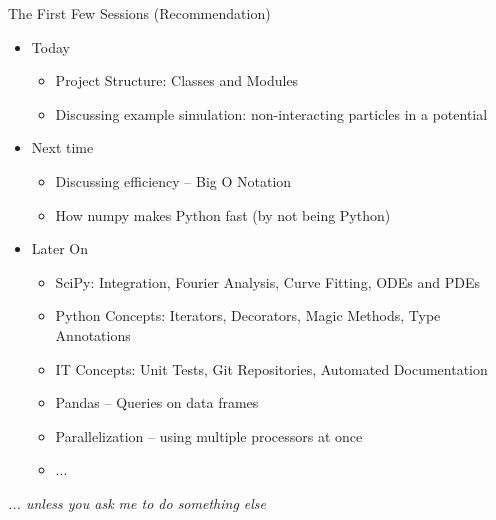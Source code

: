 \begin{frame}{The First Few Sessions (Recommendation)}
%
\begin{itemize}
\item Today
	\begin{itemize}
	\item Project Structure: Classes and Modules
	\item Discussing example simulation: non-interacting particles in a potential
	\end{itemize}
\item Next time
	\begin{itemize}
	\item Discussing efficiency -- Big O Notation
	\item How numpy makes Python fast (by not being Python)
	\end{itemize}
\item Later On
	\begin{itemize}
	\item SciPy: Integration, Fourier Analysis, Curve Fitting, ODEs and PDEs
	\item Python Concepts: Iterators, Decorators, Magic Methods, Type Annotations
	\item IT Concepts: Unit Tests, Git Repositories, Automated Documentation
	\item Pandas -- Queries on data frames
	\item Parallelization -- using multiple processors at once
	\item ...
	\end{itemize}
\end{itemize}
%
\begin{center}
\emph{... unless you ask me to do something else}
\end{center}
%
\end{frame}


